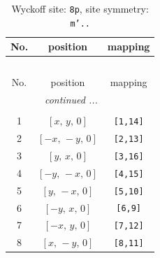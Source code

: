 \documentclass[fleqn,8pt]{jsarticle}
\begin{document}
\renewcommand{\arraystretch}{1.2}
\begin{longtable}{ccc}
\caption{Wyckoff site: {\tt 8p}, site symmetry: {\tt m'..}}
 \\
 \hline \hline
No. & position & mapping \\ \hline \endfirsthead

\multicolumn{2}{l}{\tablename\ \thetable{}} \\
 \hline \hline
No. & position & mapping \\ \hline \endhead

 \hline \hline
\multicolumn{2}{r}{\footnotesize\it continued ...} \\ \endfoot

 \hline \hline
\multicolumn{2}{r}{} \\ \endlastfoot

1 & $\left[ x,\, y,\, 0 \right]$ & {\tt [1,14]} \\ \hline
2 & $\left[ - x,\, - y,\, 0 \right]$ & {\tt [2,13]} \\ \hline
3 & $\left[ y,\, x,\, 0 \right]$ & {\tt [3,16]} \\ \hline
4 & $\left[ - y,\, - x,\, 0 \right]$ & {\tt [4,15]} \\ \hline
5 & $\left[ y,\, - x,\, 0 \right]$ & {\tt [5,10]} \\ \hline
6 & $\left[ - y,\, x,\, 0 \right]$ & {\tt [6,9]} \\ \hline
7 & $\left[ - x,\, y,\, 0 \right]$ & {\tt [7,12]} \\ \hline
8 & $\left[ x,\, - y,\, 0 \right]$ & {\tt [8,11]} \\
\end{longtable}
\renewcommand{\arraystretch}{1.2}
\end{document}
